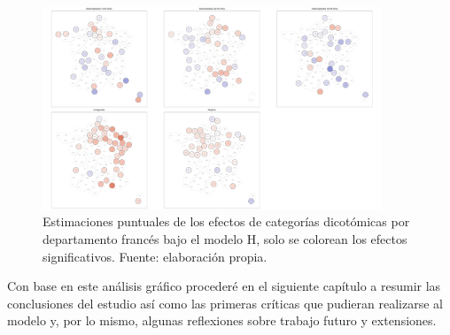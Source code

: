 \begin{figure}[h]
	\centering
	\includegraphics[width = 0.9\textwidth]{Figs/Efectos/Dorling_Efectos_Dicotom_Modelo_H}
	\caption{Estimaciones puntuales de los efectos de categorías dicotómicas por departamento francés bajo el modelo H, solo se colorean los efectos significativos. Fuente: elaboración propia.}
	\label{fig:Dorling_Efectos_Dicotom}
\end{figure}

Con base en este análisis gráfico procederé en el siguiente capítulo a resumir las conclusiones del estudio así como las primeras críticas que pudieran realizarse al modelo y, por lo mismo, algunas reflexiones sobre trabajo futuro y extensiones. 